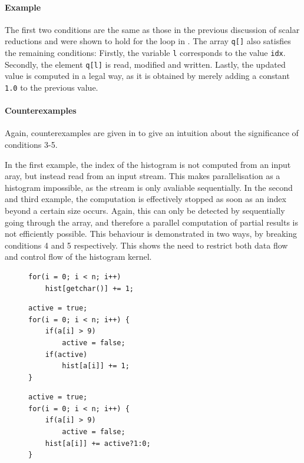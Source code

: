     \paragraph*{Example}
    The first two conditions are the same as those in the previous discussion of
    scalar reductions and were shown to hold for the loop in
    .
    The array \texttt{q[]} also satisfies the remaining conditions:
    Firstly, the variable \texttt{l} corresponds to the value \texttt{idx}.
    Secondly, the element \texttt{q[l]} is read, modified and written.
    Lastly, the updated value is computed in a legal way, as it is obtained by
    merely adding a constant \texttt{1.0} to the previous value.

    \paragraph*{Counterexamples}
    Again, counterexamples are given in  to give an
    intuition about the significance of conditions 3-5.

    In the first example, the index of the histogram is not computed from an
    input aray, but instead read from an input stream.
    This makes parallelisation as a histogram impossible, as the stream is only
    avaliable sequentially.
    In the second and third example, the computation is effectively stopped as
    soon as an index beyond a certain size occurs.
    Again, this can only be detected by sequentially going through the array,
    and therefore a parallel computation of partial results is not efficiently
    possible.
    This behaviour is demonstrated in two ways, by breaking conditions 4 and 5
    respectively.
    This shows the need to restrict both data flow and control flow of the
    histogram kernel.

\begin{figure}[t]
\begin{lstlisting}[language=MyCpp]
for(i = 0; i < n; i++)
    hist[getchar()] += 1;
\end{lstlisting}
\begin{lstlisting}[language=MyCpp]
active = true;
for(i = 0; i < n; i++) {
    if(a[i] > 9)
        active = false;
    if(active)
        hist[a[i]] += 1;
}
\end{lstlisting}
\begin{lstlisting}[language=MyCpp,label={counterexamples2},caption=
   {Counterexamples to the last three conditions:
    None of these computations can be parallelised as histograms.
    The final two example loops implement the same functionality.
    \parfillskip=0pt}]
active = true;
for(i = 0; i < n; i++) {
    if(a[i] > 9)
        active = false;
    hist[a[i]] += active?1:0;
}
\end{lstlisting}
\end{figure}

